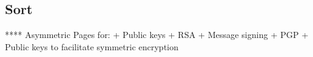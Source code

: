 
\subsection{Sort}

**** Asymmetric
Pages for:
+ Public keys
+ RSA
+ Message signing
+ PGP
+ Public keys to facilitate symmetric encryption

